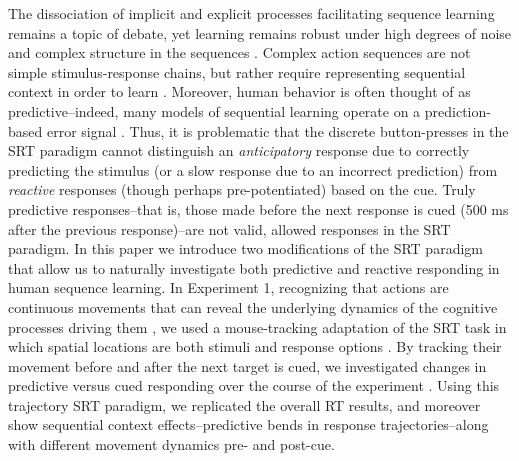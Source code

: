 \documentclass[man,floatsintext]{apa6}
\begin{document}
The dissociation of implicit and explicit processes facilitating sequence learning remains a topic of debate, yet learning remains robust under high degrees of noise and complex structure in the sequences \cite{Cleeremans:1991}. Complex action sequences are not simple stimulus-response chains, but rather require representing sequential context in order to learn \cite{Lashley:1951}. Moreover, human behavior is often thought of as predictive--indeed, many models of sequential learning operate on a prediction-based error signal \cite{Botvinick:2004,KachergisPT:2014}. Thus, it is problematic that the discrete button-presses in the SRT paradigm cannot distinguish an {\em anticipatory} response due to correctly predicting the stimulus (or a slow response due to an incorrect prediction) from {\em reactive} responses (though perhaps pre-potentiated) based on the cue. Truly predictive responses--that is, those made before the next response is cued (500 ms after the previous response)--are not valid, allowed responses in the SRT paradigm. %
In this paper we introduce two modifications of the SRT paradigm that allow us to naturally investigate both predictive and reactive responding in human sequence learning. In Experiment 1, recognizing that actions are continuous movements that can reveal the underlying dynamics of the cognitive processes driving them \cite{Spivey:2006}, we used a mouse-tracking adaptation of the SRT task in which spatial locations are both stimuli and response options \cite{Kachergis:2014b,Kachergis:2014a}. By tracking their movement before and after the next target is cued, we investigated changes in predictive versus cued responding over the course of the experiment \cite{Tubau:2007}. Using this trajectory SRT paradigm, we replicated the overall  RT results, and moreover show sequential context effects--predictive bends in response trajectories--along with different movement dynamics pre- and post-cue.
\end{document}
